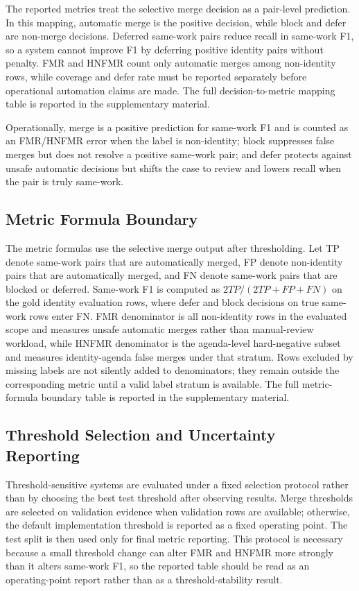 \documentclass[11pt]{article}
\begin{document}
The reported metrics treat the selective merge decision as a pair-level prediction. In this mapping, automatic merge is the positive decision, while block and defer are non-merge decisions. Deferred same-work pairs reduce recall in same-work F1, so a system cannot improve F1 by deferring positive identity pairs without penalty. FMR and HNFMR count only automatic merges among non-identity rows, while coverage and defer rate must be reported separately before operational automation claims are made. The full decision-to-metric mapping table is reported in the supplementary material.

Operationally, merge is a positive prediction for same-work F1 and is counted as an FMR/HNFMR error when the label is non-identity; block suppresses false merges but does not resolve a positive same-work pair; and defer protects against unsafe automatic decisions but shifts the case to review and lowers recall when the pair is truly same-work.

\subsection{Metric Formula Boundary}

The metric formulas use the selective merge output after thresholding. Let TP denote same-work pairs that are automatically merged, FP denote non-identity pairs that are automatically merged, and FN denote same-work pairs that are blocked or deferred. Same-work F1 is computed as $2TP/(2TP+FP+FN)$ on the gold identity evaluation rows, where defer and block decisions on true same-work rows enter FN. FMR denominator is all non-identity rows in the evaluated scope and measures unsafe automatic merges rather than manual-review workload, while HNFMR denominator is the agenda-level hard-negative subset and measures identity-agenda false merges under that stratum. Rows excluded by missing labels are not silently added to denominators; they remain outside the corresponding metric until a valid label stratum is available. The full metric-formula boundary table is reported in the supplementary material.

\subsection{Threshold Selection and Uncertainty Reporting}

Threshold-sensitive systems are evaluated under a fixed selection protocol rather than by choosing the best test threshold after observing results. Merge thresholds are selected on validation evidence when validation rows are available; otherwise, the default implementation threshold is reported as a fixed operating point. The test split is then used only for final metric reporting. This protocol is necessary because a small threshold change can alter FMR and HNFMR more strongly than it alters same-work F1, so the reported table should be read as an operating-point report rather than as a threshold-stability result.
\end{document}
